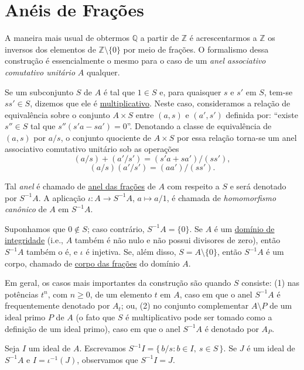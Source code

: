\section{Anéis de Frações}

A maneira mais usual de obtermos $\mathbb{Q}$ a partir de $\mathbb{Z}$ é acrescentarmos a $\mathbb{Z}$ os inversos 
dos elementos de $\mathbb{Z} \setminus \{0\}$ por meio de frações. O formalismo dessa construção é essencialmente 
o mesmo para o caso de um \emph{anel associativo comutativo unitário} $A$ qualquer.

Se um subconjunto $S$ de $A$ é tal que $1 \in S$ e, para quaisquer $s$ e $s'$ em $S$, tem-se $ss' \in S$, dizemos 
que ele é \underline{multiplicativo}. Neste caso, consideramos a relação de equivalência sobre o conjunto
$A \times S$ entre $(a,s)$ e $(a',s')$ definida por: ``existe $s'' \in S$ tal que $s''(s'a - sa') = 0$''.
Denotando a classe de equivalência de $(a,s)$ por $a/s$, o conjunto quociente de $A \times S$ por essa relação 
torna-se um anel associativo comutativo unitário sob as operações
\[
(a/s) + (a'/s') = (s'a + sa')/(ss'),
\]
\[
(a/s)(a'/s') = (aa')/(ss').
\]

\begin{definicao}
Tal \emph{anel} é chamado de \underline{anel das frações} de $A$ com respeito a $S$ e será denotado por $S^{-1}A$. 
A aplicação $\iota : A \to S^{-1}A$, $a \mapsto a/1$, é chamada de \emph{homomorfismo canônico} de $A$ em $S^{-1}A$.
\end{definicao}

Suponhamos que $0 \notin S$; caso contrário, $S^{-1}A = \{0\}$. Se $A$ é um \underline{domínio de integridade} 
(i.e., $A$ também é não nulo e não possui divisores de zero), então $S^{-1}A$ também o é, e $\iota$ é injetiva.
Se, além disso, $S = A \setminus \{0\}$, então $S^{-1}A$ é um corpo, chamado de \underline{corpo das frações} do domínio $A$.

Em geral, os casos mais importantes da construção são quando $S$ consiste: (1) nas potências $t^n$, com $n \geq 0$, 
de um elemento $t$ em $A$, caso em que o anel $S^{-1}A$ é frequentemente denotado por $A_t$; ou, (2) no conjunto complementar 
$A \setminus P$ de um ideal primo $P$ de $A$ (o fato que $S$ é multiplicativo pode ser tomado como a definição de um ideal primo), 
caso em que o anel $S^{-1}A$ é denotado por $A_P$.

Seja $I$ um ideal de $A$. Escrevamos $S^{-1}I = \{\, b/s : b \in I,\ s \in S \,\}$. Se $J$ é um ideal de $S^{-1}A$ e 
$I = \iota^{-1}(J)$, observamos que $S^{-1}I = J$.

